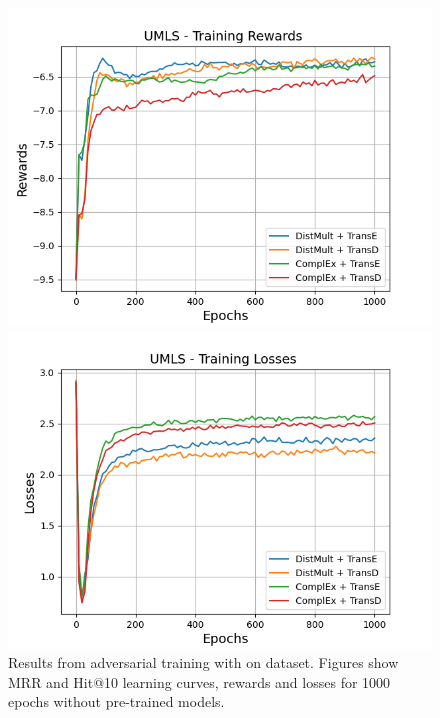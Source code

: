 \begin{figure}[H]
    \begin{minipage}{.45\textwidth}
      \centering
      \includegraphics[width=0.9\linewidth]{figures/results/gan_train/not_pretrained/random/umls/epochs1000/random_umls_rew.png}
    \end{minipage}%
     \begin{minipage}{.45\textwidth}
      \centering
      \includegraphics[width=0.9\linewidth]{figures/results/gan_train/not_pretrained/random/umls/epochs1000/random_umls_losses.png}
    \end{minipage}%
    \caption{Results from adversarial training with \origsampling on \umls dataset.
    Figures show MRR and Hit@10 learning curves, rewards and losses for 1000 epochs without pre-trained models.}
    \label{fig:gan_train_not_pretrained_random_umls}
\end{figure}
